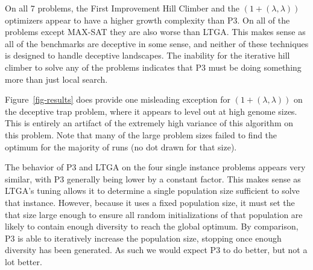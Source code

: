\documentclass{sig-alternate}
\begin{document}
On all 7 problems, the First Improvement Hill Climber and the $(1+(\lambda,\lambda))$
optimizers appear to have a higher growth complexity than P3.  On all of the problems
except MAX-SAT they are also worse than LTGA.  This makes sense as all of the
benchmarks are deceptive in some sense, and neither of these techniques is designed
to handle deceptive landscapes.  The inability for the iterative hill climber to solve
any of the problems indicates that P3 must be doing something more than just local search.

Figure~\ref{fig-results} does provide one misleading
exception for $(1+(\lambda,\lambda))$ on the deceptive trap problem, where it appears to
level out at high genome sizes.  This is entirely an artifact of the extremely high
variance of this algorithm on this problem.  Note that many of the large problem
sizes failed to find the optimum for the majority of runs (no dot drawn for that size).

The behavior of P3 and LTGA on the four single instance problems appears very similar,
with P3 generally being lower by a constant factor.  This makes sense as LTGA's
tuning allows it to determine a single population size sufficient to solve that
instance.  However, because it uses a fixed population size, it must set the that
size large enough to ensure all random initializations of that population are
likely to contain enough diversity to reach the global optimum.  By comparison, P3 is able to
iteratively increase the population size, stopping once enough diversity has been generated.
As such we would expect P3 to do better, but not a lot better.
\end{document}
